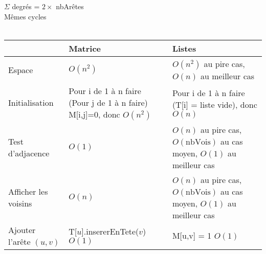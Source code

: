 \documentclass[a4paper,11pt]{article}
\begin{document}
 $\Sigma$ degrés = $2 \times $ nbArêtes \\
 Mêmes cycles\\
\\
\begin{tabular}{l|p{6cm}|p{8cm}}
	& Matrice & Listes \\ \hline
Espace & $O(n^2)$ & $O(n^2)$ au pire cas, $O(n)$ au meilleur cas \\ \hline
Initialisation & Pour i de 1 à n faire (Pour j de 1 à n faire) M[i,j]=0, donc $O(n^2)$ & Pour i de 1 à n faire (T[i] = liste vide), donc $O(n)$ \\ \hline
Test d'adjacence & $O(1)$ & $O(n)$ au pire cas, $O(\mathrm{nbVois})$ au cas moyen, $O(1)$ au meilleur cas \\ \hline
Afficher les voisins & $O(n)$ & $O(n)$ au pire cas, $O(\mathrm{nbVois})$ au cas moyen, $O(1)$ au meilleur cas \\ \hline
Ajouter l'arête $(u,v)$ & T[$u$].insererEnTete($v$) $O(1)$ & M[u,v] = 1 $O(1)$ \\ \hline
\end{tabular} \\
\\
\end{document}

